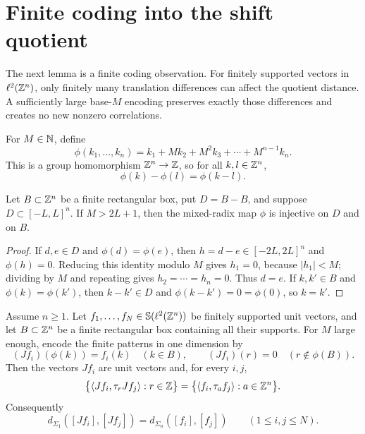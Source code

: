 \section{Finite coding into the shift quotient}

The next lemma is a finite coding observation.  For finitely supported vectors in
$\ell^2(\mathbb Z^n)$, only finitely many translation differences can affect the
quotient distance.  A sufficiently large base-$M$ encoding preserves exactly
those differences and creates no new nonzero correlations.

\begin{definition}\label{def:mixed-radix-map}
\leanok
For $M\in\mathbb N$, define
\[
        \phi(k_1,\dots,k_n)=k_1+Mk_2+M^2k_3+\cdots+M^{n-1}k_n .
\]
This is a group homomorphism $\mathbb Z^n\to\mathbb Z$, so for all $k,l\in\mathbb Z^n$,
\[
        \phi(k)-\phi(l)=\phi(k-l).
\]
\end{definition}

\begin{lemma}
\label{lem:mixed-radix-injective}
\leanok
{}
Let $B\subset\mathbb Z^n$ be a finite rectangular box, put $D=B-B$, and suppose
$D\subset[-L,L]^n$.  If $M>2L+1$, then the mixed-radix map $\phi$ is injective
on $D$ and on $B$.
\end{lemma}

\begin{proof}
If $d,e\in D$ and $\phi(d)=\phi(e)$, then
$h=d-e\in[-2L,2L]^n$ and $\phi(h)=0$.  Reducing this identity modulo $M$ gives
$h_1=0$, because $|h_1|<M$; dividing by $M$ and repeating gives
$h_2=\cdots=h_n=0$.  Thus $d=e$.  If $k,k'\in B$ and $\phi(k)=\phi(k')$, then
$k-k'\in D$ and $\phi(k-k')=0=\phi(0)$, so $k=k'$.
\end{proof}

\begin{lemma}\label{lem:coding-preserves-correlations}
\leanok
{}
Assume $n\ge1$.  Let
$f_1,\dots,f_N\in\mathbb S(\ell^2(\mathbb Z^n))$ be finitely supported unit vectors,
and let $B\subset\mathbb Z^n$ be a finite rectangular box containing all their supports.
For $M$ large enough, encode the finite patterns in one dimension by
\[
        (Jf_i)(\phi(k))=f_i(k)\quad(k\in B),
        \qquad
        (Jf_i)(r)=0\quad(r\notin\phi(B)).
\]
Then the vectors $Jf_i$ are unit vectors and, for every $i,j$,
\begin{equation}\label{eq:coding-correlations}
        \bigl\{\left\langle Jf_i,\tau_r Jf_j\right\rangle:r\in\mathbb Z\bigr\}
        =
        \bigl\{\left\langle f_i,\tau_a f_j\right\rangle:a\in\mathbb Z^n\bigr\}.
\end{equation}
Consequently
\[
        d_{\Sigma_1}([Jf_i],[Jf_j])=d_{\Sigma_n}([f_i],[f_j])
        \qquad(1\le i,j\le N).
\]
\end{lemma}

